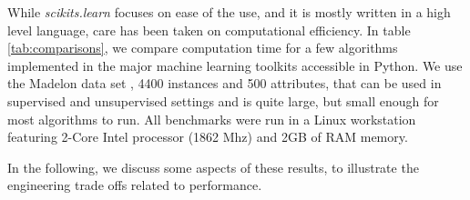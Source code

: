\documentclass[twoside,11pt]{article}
\begin{document}

While \emph{scikits.learn} focuses on ease of the use, and it is
mostly written in a high level language, care has been taken on
computational efficiency. In table \ref{tab:comparisons}, we compare
computation time for a few algorithms implemented in the major machine
learning toolkits accessible in Python. We use the Madelon data
set \citep{Guyon2004}, 4400 instances and 500 attributes,
that can be used in supervised
and unsupervised settings and is quite large, but small enough for most
algorithms to run. All benchmarks were run in a Linux workstation featuring
2-Core Intel processor (1862 Mhz) and 2GB of RAM memory.

%
%
In the following, we discuss some aspects of these results, to illustrate
the engineering trade offs related to performance. 
\end{document}
